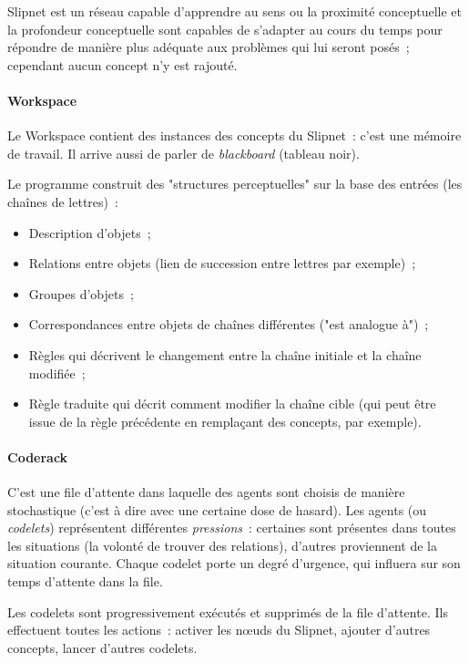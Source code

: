 \documentclass[a4paper, 12pt]{article}
\begin{document}
Slipnet est un réseau capable d'apprendre au sens ou la proximité conceptuelle et la profondeur conceptuelle sont capables de s'adapter au cours du temps pour répondre de manière plus adéquate aux problèmes qui lui seront posés~; cependant aucun concept n'y est rajouté.

\paragraph{Workspace}
Le Workspace contient des instances des concepts du Slipnet~: c'est une mémoire de travail. Il arrive aussi de parler de \textit{blackboard} (tableau noir).

Le programme construit des "structures perceptuelles" sur la base des entrées (les chaînes de lettres)~: 
\begin{itemize}
 \item Description d'objets~;
 \item Relations entre objets (lien de succession entre lettres par exemple)~;
 \item Groupes d'objets~;
 \item Correspondances entre objets de chaînes différentes ("est analogue à")~;
 \item Règles qui décrivent le changement entre la chaîne initiale et la chaîne modifiée~;
 \item Règle traduite qui décrit comment modifier la chaîne cible (qui peut être issue de la règle précédente en remplaçant des concepts, par exemple).
\end{itemize}


\paragraph{Coderack}
C'est une file d'attente dans laquelle des agents sont choisis de manière stochastique (c'est à dire avec une certaine dose de hasard). Les agents (ou \textit{codelets}) représentent différentes \textit{pressions}~: certaines sont présentes dans toutes les situations (la volonté de trouver des relations), d'autres proviennent de la situation courante. Chaque codelet porte un degré d'urgence, qui influera sur son temps d'attente dans la file.

Les codelets sont progressivement exécutés et supprimés de la file d'attente. Ils effectuent toutes les actions~: activer les n\oe{}uds du Slipnet, ajouter d'autres concepts, lancer d'autres codelets.
\end{document}
